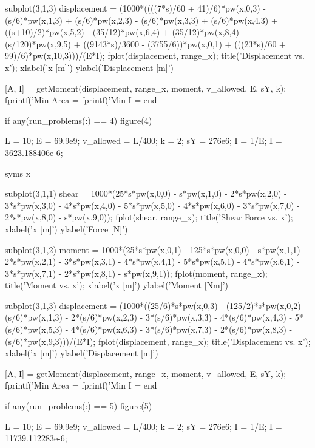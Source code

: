 \documentclass[a4paper]{article}
\begin{document}
\begin{verbatim*}
    subplot(3,1,3)
    displacement = (1000*((((7*s)/60 + 41)/6)*pw(x,0,3) - (s/6)*pw(x,1,3) + (s/6)*pw(x,2,3) - (s/6)*pw(x,3,3) + (s/6)*pw(x,4,3) + ((s+10)/2)*pw(x,5,2) - (35/12)*pw(x,6,4) + (35/12)*pw(x,8,4) - (s/120)*pw(x,9,5) + ((9143*s)/3600 - (3755/6))*pw(x,0,1) + (((23*s)/60 + 99)/6)*pw(x,10,3)))/(E*I);
    fplot(displacement, range_x);
    title('Displacement vs. x');
    xlabel('x [m]')
    ylabel('Displacement [m]')

    [A, I] = getMoment(displacement, range_x, moment, v_allowed, E, sY, k);
    fprintf('Min Area = %
    fprintf('Min I = %
end


if any(run_problems(:) == 4)
    figure(4)

    L = 10; %
    E = 69.9e9; %
    v_allowed = L/400; %
    k = 2; %
    sY = 276e6; %
    I = 1/E;
    I = 3623.188406e-6; %

    syms x

    subplot(3,1,1)
    shear = 1000*(25*s*pw(x,0,0) - s*pw(x,1,0) - 2*s*pw(x,2,0) - 3*s*pw(x,3,0) - 4*s*pw(x,4,0) - 5*s*pw(x,5,0) - 4*s*pw(x,6,0) - 3*s*pw(x,7,0) - 2*s*pw(x,8,0) - s*pw(x,9,0));
    fplot(shear, range_x);
    title('Shear Force vs. x');
    xlabel('x [m]')
    ylabel('Force [N]')

    subplot(3,1,2)
    moment = 1000*(25*s*pw(x,0,1) - 125*s*pw(x,0,0) - s*pw(x,1,1) - 2*s*pw(x,2,1) - 3*s*pw(x,3,1) - 4*s*pw(x,4,1) - 5*s*pw(x,5,1) - 4*s*pw(x,6,1) - 3*s*pw(x,7,1) - 2*s*pw(x,8,1) - s*pw(x,9,1));
    fplot(moment, range_x);
    title('Moment vs. x');
    xlabel('x [m]')
    ylabel('Moment [Nm]')

    subplot(3,1,3)
    displacement = (1000*((25/6)*s*pw(x,0,3) - (125/2)*s*pw(x,0,2) - (s/6)*pw(x,1,3) - 2*(s/6)*pw(x,2,3) - 3*(s/6)*pw(x,3,3) - 4*(s/6)*pw(x,4,3) - 5*(s/6)*pw(x,5,3) - 4*(s/6)*pw(x,6,3) - 3*(s/6)*pw(x,7,3) - 2*(s/6)*pw(x,8,3) - (s/6)*pw(x,9,3)))/(E*I);
    fplot(displacement, range_x);
    title('Displacement vs. x');
    xlabel('x [m]')
    ylabel('Displacement [m]')

    [A, I] = getMoment(displacement, range_x, moment, v_allowed, E, sY, k);
    fprintf('Min Area = %
    fprintf('Min I = %
end


if any(run_problems(:) == 5)
    figure(5)

    L = 10; %
    E = 69.9e9; %
    v_allowed = L/400; %
    k = 2; %
    sY = 276e6; %
    I = 1/E; %
    I = 11739.112283e-6;


\end{verbatim*}
\end{document}
